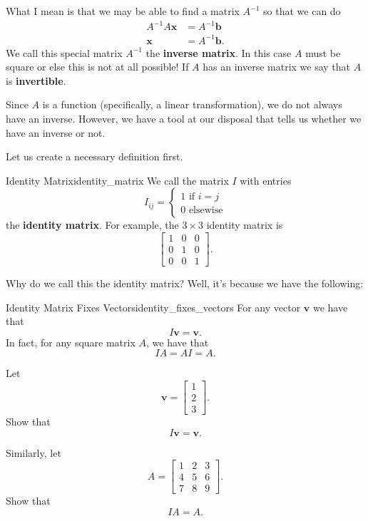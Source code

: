         What I mean is that we may be able to find a matrix $A^{-1}$ so that we can do 
        \begin{align*}
            A^{-1}A\mathbf{x}&=A^{-1}\mathbf{b}\\
            \mathbf{x}&=A^{-1}\mathbf{b}.
        \end{align*}
        We call this special matrix $A^{-1}$ the \textbf{inverse matrix}. In this case $A$ must be square or else this is not at all possible! If $A$ has an inverse matrix we say that $A$ is \textbf{invertible}.
        
        Since $A$ is a function (specifically, a linear transformation), we do not always have an inverse. However, we have a tool at our disposal that tells us whether we have an inverse or not. 
        
        Let us create a necessary definition first.
        
        \begin{df}{Identity Matrix}{identity_matrix}
        We call the matrix $I$ with entries 
        \[I_{ij}=
        \begin{cases}
        1 \textrm{ if } i=j\\
        0 \textrm{ elsewise}
        \end{cases}
        \]
        the \textbf{identity matrix}.  For example, the $3\times 3$ identity matrix is
        \[
        \begin{bmatrix}
        1 & 0 & 0\\
        0 & 1 & 0\\
        0 & 0 & 1
        \end{bmatrix}.
        \]
        \end{df}
        
        Why do we call this the identity matrix? Well, it's because we have the following:
        
        \begin{prop}{Identity Matrix Fixes Vectors}{identity_fixes_vectors}
        For any vector $\mathbf{v}$ we have that
        \[
        I\mathbf{v}=\mathbf{v}.
        \]
        In fact, for any square matrix $A$, we have that
        \[
        IA=AI=A.
        \]
        \end{prop}
        
        \begin{exercise}
        Let
        \[
        \mathbf{v}=\begin{bmatrix} 1 \\ 2 \\ 3 \end{bmatrix}.
        \]
        Show that
        \[
        I\mathbf{v}=\mathbf{v}.
        \]
        
        Similarly, let
        \[
        A= \begin{bmatrix}
        1 & 2 & 3\\
        4 & 5 & 6\\
        7 & 8 & 9
        \end{bmatrix}.
        \]
        Show that
        \[
        IA=A.
        \]
        \end{exercise}
        
